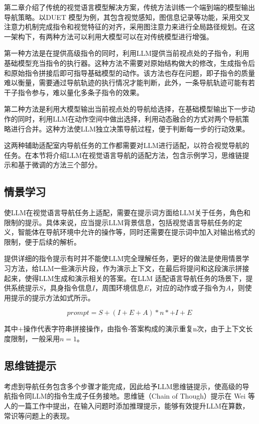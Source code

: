 \documentclass[bachelor]{thesis-uestc}
\begin{document}
第二章介绍了传统的视觉语言模型解决方案，传统方法训练一个端到端的模型输出导航策略。以DUET 模型为例，其包含视觉感知，图信息记录等功能，采用交叉注意力机制完成指令和视觉特征的对齐，采用图注意力来进行全局路径规划。在这一架构下，有两种方法可以利用大模型可以在对传统模型进行增强。

第一种方法是在提供高级指令的同时，利用LLM提供当前视点处的子指令，利用基础模型充当指令的执行器。这种方法不需要对原始结构做大的修改，生成指令后和原始指令拼接后即可指导基础模型的动作。该方法也存在问题，即子指令的质量难以衡量，需要通过导航轨迹的执行情况才能判断，此外，一条导航轨迹可能有若干子指令参与，难以量化多条子指令的效果。

第二种方法是利用大模型输出当前视点处的导航给选择，在基础模型输出下一步动作的同时，利用LLM在动作空间中做出选择，利用动态融合的方式对两个导航策略进行合并。这种方法使LLM独立决策导航过程，便于判断每一步的行动效果。

这两种辅助适配室内导航任务的工作都需要对LLM进行适配，以符合视觉导航的任务。在本节将介绍LLM在视觉语言导航的适配方法，包含示例学习，思维链提示和基于微调的方法三个部分。

\subsection{情景学习}

使LLM在视觉语言导航任务上适配，需要在提示词方面给LLM关于任务，角色和限制的提示。具体来说，应当提示LLM背景信息，包括视觉语言导航任务的定义，智能体在导航环境中允许的操作等，同时还需要在提示词中加入对输出格式的限制，便于后续的解析。

提供详细的指令提示有时并不能使LLM完全理解任务，更好的做法是使用情景学习方法，给LLM一些演示片段，作为演示上下文，在最后将提问和这段演示拼接起来，使得LLM生成和演示相关的答案。在LLM 适配语言导航任务的场景下，提供系统提示$S$，具身指令信息$I$，周围环境信息$E$，对应的动作或子指令为$A$，则使用提示的提示方法如式所示。

\begin{equation}
    prompt=S+(I+E+A)*n*+I+E
\label{icl}
\end{equation}

其中$+$操作代表字符串拼接操作，由指令-答案构成的演示重复n次，由于上下文长度限制，一般采用$n=1$。

\subsection{思维链提示}

考虑到导航任务包含多个步骤才能完成，因此给予LLM思维链提示，使高级的导航指令同LLM的指令生成子任务接地。思维链（Chain of Though）提示在 Wei 等人的一篇工作中提出，在输入问题时添加推理提示，能够有效提升LLM在算数，常识等问题上的表现。
\end{document}
